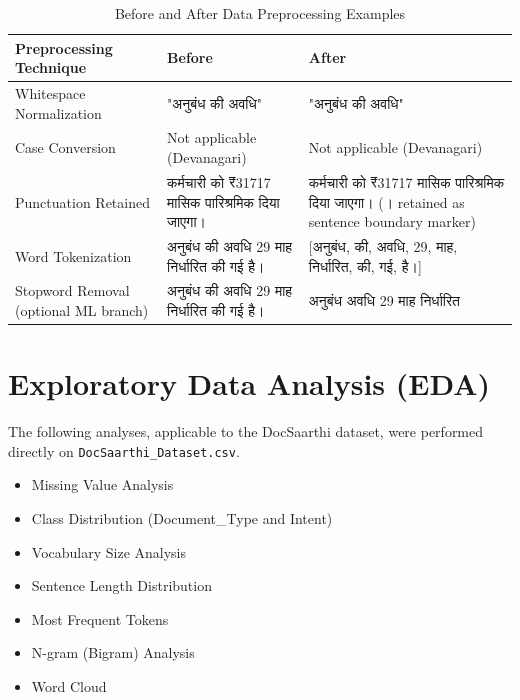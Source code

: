 \begin{table}[H]
\centering
\caption{Before and After Data Preprocessing Examples}
\label{tab:beforeafter}

\renewcommand{\arraystretch}{1.5}

\begin{tabular}{|p{4cm}|p{5.5cm}|p{5.5cm}|}
\hline
\textbf{Preprocessing Technique} &
\textbf{Before} &
\textbf{After}
\\
\hline

Whitespace Normalization &
"अनुबंध  की  अवधि" &
"अनुबंध की अवधि"
\\
\hline

Case Conversion &
Not applicable (Devanagari) &
Not applicable (Devanagari)
\\
\hline

Punctuation Retained &
कर्मचारी को ₹31717 मासिक पारिश्रमिक दिया जाएगा। &
कर्मचारी को ₹31717 मासिक पारिश्रमिक दिया जाएगा। (। retained as sentence boundary marker)
\\
\hline

Word Tokenization &
अनुबंध की अवधि 29 माह निर्धारित की गई है। &
[अनुबंध, की, अवधि, 29, माह, निर्धारित, की, गई, है।]
\\
\hline

Stopword Removal (optional ML branch) &
अनुबंध की अवधि 29 माह निर्धारित की गई है। &
अनुबंध अवधि 29 माह निर्धारित
\\
\hline

\end{tabular}

\end{table}


\section{Exploratory Data Analysis (EDA)}

The following analyses, applicable to the DocSaarthi dataset, were performed directly on \texttt{DocSaarthi\_Dataset.csv}.

\begin{itemize}

\item Missing Value Analysis

\item Class Distribution (Document\_Type and Intent)

\item Vocabulary Size Analysis

\item Sentence Length Distribution

\item Most Frequent Tokens

\item N-gram (Bigram) Analysis

\item Word Cloud

\end{itemize}

